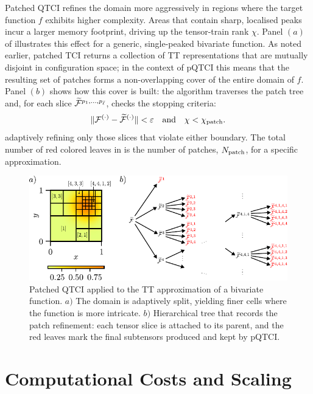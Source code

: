 Patched QTCI refines the domain more aggressively in regions where the target function $f$ exhibits higher complexity. Areas that contain sharp, localised peaks incur a larger memory footprint, driving up the tensor-train rank $\chi$. Panel $(a)$ of  illustrates this effect for a generic, single-peaked bivariate function. As noted earlier, patched TCI returns a collection of TT representations that are mutually disjoint in configuration space; in the context of pQTCI this means that the resulting set of patches forms a non-overlapping cover of the entire domain of $f$. Panel $(b)$ shows how this cover is built: the algorithm traverses the patch tree and, for each slice $\widetilde{\mathcal{F}}^{p_1,\dots,p_{\bar\ell}}$, checks the stopping criteria: 
\begin{equation}
	\| \mathcal{F}^{(\cdot)} - \widetilde{\mathcal{F}}^{(\cdot)} \| < \varepsilon \quad \text{and} \quad \chi < \chi_{\text{patch}}.
	\label{eq:patchConvergence}
\end{equation}
adaptively refining only those slices that violate either boundary. The total number of red colored leaves in  is the number of patches, $N_{\text{patch}}$, for a specific approximation.
\begin{figure}[ht!]
	\includegraphics{figures/PatchingTree.pdf}
	\caption{Patched QTCI applied to the TT approximation of a bivariate function. $a)$ The domain is adaptively split, yielding finer cells where the function is more intricate. $b)$ Hierarchical tree that records the patch refinement: each tensor slice is attached to its parent, and the red leaves mark the final subtensors produced and kept by pQTCI. }
	\label{fig:patchTree}
\end{figure}

\section{Computational Costs and Scaling}
\label{sec:patchingCost}


